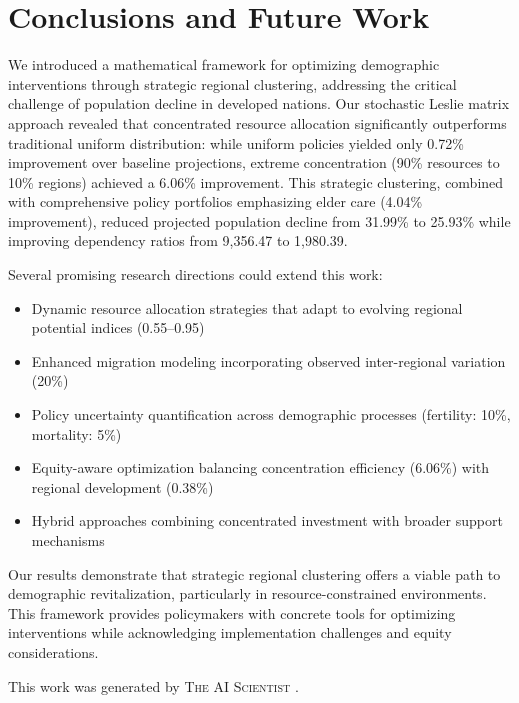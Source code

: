 \documentclass{article} %
\begin{document}
\section{Conclusions and Future Work}
\label{sec:conclusion}

We introduced a mathematical framework for optimizing demographic interventions through strategic regional clustering, addressing the critical challenge of population decline in developed nations. Our stochastic Leslie matrix approach revealed that concentrated resource allocation significantly outperforms traditional uniform distribution: while uniform policies yielded only 0.72\% improvement over baseline projections, extreme concentration (90\% resources to 10\% regions) achieved a 6.06\% improvement. This strategic clustering, combined with comprehensive policy portfolios emphasizing elder care (4.04\% improvement), reduced projected population decline from 31.99\% to 25.93\% while improving dependency ratios from 9,356.47 to 1,980.39.

Several promising research directions could extend this work:
\begin{itemize}
    \item Dynamic resource allocation strategies that adapt to evolving regional potential indices (0.55--0.95)
    \item Enhanced migration modeling incorporating observed inter-regional variation (20\%)
    \item Policy uncertainty quantification across demographic processes (fertility: 10\%, mortality: 5\%)
    \item Equity-aware optimization balancing concentration efficiency (6.06\%) with regional development (0.38\%)
    \item Hybrid approaches combining concentrated investment with broader support mechanisms
\end{itemize}

Our results demonstrate that strategic regional clustering offers a viable path to demographic revitalization, particularly in resource-constrained environments. This framework provides policymakers with concrete tools for optimizing interventions while acknowledging implementation challenges and equity considerations.

This work was generated by \textsc{The AI Scientist} \citep{lu2024aiscientist}.



\end{document}
